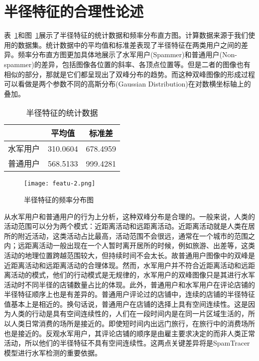 \section{半径特征的合理性论述}

表~\ref{tbl:radius}和图~\ref{fig:hist}展示了半径特征的统计数据和频率分布直方图。计算数据来源于我们使用的数据集。统计数据中的平均值和标准差表现了半径特征在两类用户之间的差异。频率分布直方图更加具体地展示了水军用户(Spammer)和普通用户(Non-spammer)的差异，包括图像各位置的斜率、各顶点位置等。但是二者的图像也有相似的部分，那就是它们都呈现出了双峰分布的趋势。而这种双峰图像的形成过程可以看做是两个参数不同的高斯分布(Gaussian Distribution)在对数横坐标轴上的叠加。

\begin{table}[htbp]
	\caption{半径特征的统计数据}
	\label{tbl:radius}
	\centering
	\begin{tabular}{ccc}
		\toprule
		& 平均值 & 标准差  \\
		\midrule
		水军用户      & 310.0604  & 678.4959  \\
		普通用户  & 568.5133  &	999.4281 \\
		\bottomrule
	\end{tabular}
\end{table}

\begin{figure}[htbp]
	\centering
	\begin{minipage}[htbp]{\textwidth}
		\centering
		\texttt{[image: featu-2.png]}
		\caption[半径特征的频率分布图]
		{半径特征的频率分布图\label{fig:hist}}		
	\end{minipage}     
\end{figure}

从水军用户和普通用户的行为上分析，这种双峰分布是合理的。一般来说，人类的活动范围可以分为两个模式：近距离活动和远距离活动。近距离活动就是人类在居所的附近活动，这类活动占比最高，活动范围不会很远，通常在一个城市的范围之内；远距离活动一般出现在一个人暂时离开居所的时候，例如旅游、出差等，这类活动的地理位置跨越范围较大，但持续时间不会太长。故普通用户图像中的双峰是近距离活动和远距离活动的合理体现。然而，水军用户并不符合近距离活动和远距离活动的模式，他们的行动模式是无规律的，水军用户的双峰图像只是其进行水军活动时不同半径的店铺数量占比的体现。此外，普通用户和水军用户在评论店铺的半径特征顺序上也是有差异的。普通用户评论过的店铺中，连续的店铺的半径特征值基本上是相近的。换句话说，普通用户在店铺的选择上具有空间连续性。这是因为人类的行动是具有空间连续性的，人们在一段时间内是在同一片区域生活的，所以人类日常消费的场所是接近的。即使短时间内出远门旅行，在旅行中的消费场所也是接近的。反观水军用户，其评论店铺的顺序是由雇主要求决定的而非人类正常活动，所以他们的半径特征不具有空间连续性。这两点关键差异将是SpamTracer模型进行水军检测的重要依据。

